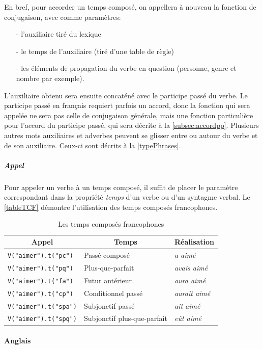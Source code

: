 \documentclass[11pt]{article} %
\newcommand{\real}[1]{\emph{#1}}
\begin{document}
En bref, pour accorder un temps
composé, on appellera à nouveau la fonction de conjugaison, avec comme
paramètres:
\begin{itemize}
\item[-] l'auxiliaire tiré du lexique
\item[-] le temps de l'auxiliaire (tiré d'une table de règle)
\item[-] les éléments de propagation du verbe en question (personne, genre et nombre par exemple).
\end{itemize}
L'auxiliaire obtenu
sera ensuite concaténé avec le participe passé du verbe. Le participe passé 
en français requiert
parfois un accord, donc la fonction qui sera appelée ne sera pas celle
de conjugaison générale, mais une fonction particulière pour l'accord du
participe passé, qui sera décrite à la \autoref{subsec:accordpp}. Plusieurs
autres mots auxiliaires et adverbes peuvent se glisser entre ou autour
du verbe et de son auxiliaire. Ceux-ci sont décrits à la \autoref{typePhrases}.

\subparagraph{Appel}
Pour appeler un verbe à un temps composé, il suffit de placer le paramètre correspondant dans la propriété \emph{temps} d'un verbe ou d'un syntagme verbal. Le \autoref{tableTCF} démontre l'utilisation des temps composés francophones.

\begin{table}[ht]
\caption{Les temps composés francophones}
\centering
\begin{tabular}{|l|l|l|}
\hline
\multicolumn{1}{|c}{Appel} & \multicolumn{1}{|c}{Temps} & \multicolumn{1}{|c|}{Réalisation} \\
\hline
\hline
\texttt{V("aimer").t("pc")} & Passé composé & \real{a aimé} \\
\hline
\texttt{V("aimer").t("pq")} & Plus-que-parfait & \real{avais aimé} \\
\hline
\texttt{V("aimer").t("fa")} & Futur antérieur & \real{aura aimé} \\
\hline
\texttt{V("aimer").t("cp")} & Conditionnel passé & \real{aurait aimé} \\
\hline
\texttt{V("aimer").t("spa")} & Subjonctif passé & \real{ait aimé} \\
\hline
\texttt{V("aimer").t("spq")} & Subjonctif plus-que-parfait & \real{eût aimé} \\
\hline
\end{tabular}
\label{tableTCF}
\end{table}

\paragraph{Anglais}
\end{document}

